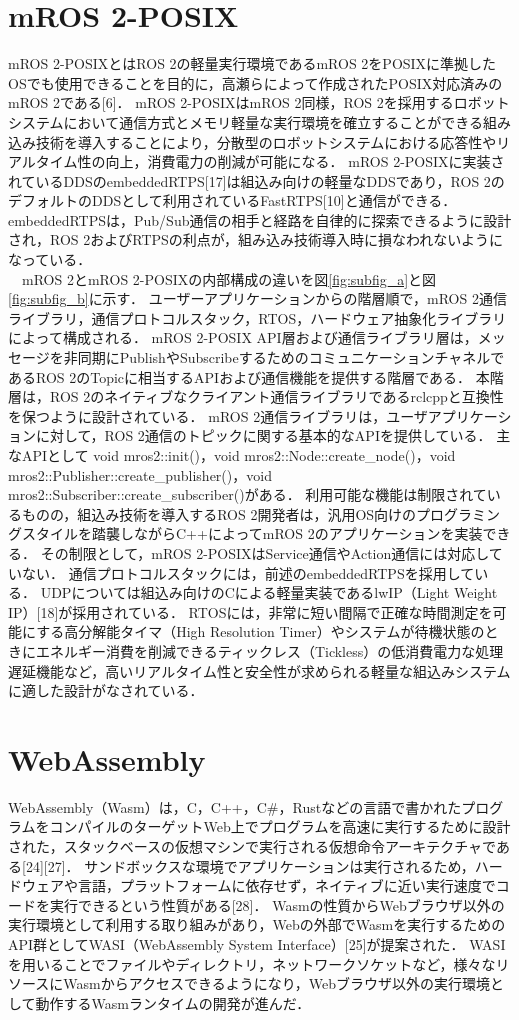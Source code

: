 \section{mROS 2-POSIX}
mROS 2-POSIXとはROS 2の軽量実行環境であるmROS 2をPOSIXに準拠したOSでも使用できることを目的に，高瀬らによって作成されたPOSIX対応済みのmROS 2である[6]．
mROS 2-POSIXはmROS 2同様，ROS 2を採用するロボットシステムにおいて通信方式とメモリ軽量な実行環境を確立することができる組み込み技術を導入することにより，分散型のロボットシステムにおける応答性やリアルタイム性の向上，消費電力の削減が可能になる．
mROS 2-POSIXに実装されているDDSのembeddedRTPS[17]は組込み向けの軽量なDDSであり，ROS 2のデフォルトのDDSとして利用されているFastRTPS[10]と通信ができる．
embeddedRTPSは，Pub/Sub通信の相手と経路を自律的に探索できるように設計され，ROS 2およびRTPSの利点が，組み込み技術導入時に損なわれないようになっている．
\\　mROS 2とmROS 2-POSIXの内部構成の違いを図\ref{fig:subfig_a}と図\ref{fig:subfig_b}に示す．
ユーザーアプリケーションからの階層順で，mROS 2通信ライブラリ，通信プロトコルスタック，RTOS，ハードウェア抽象化ライブラリによって構成される．
mROS 2-POSIX API層および通信ライブラリ層は，メッセージを非同期にPublishやSubscribeするためのコミュニケーションチャネルであるROS 2のTopicに相当するAPIおよび通信機能を提供する階層である．
本階層は，ROS 2のネイティブなクライアント通信ライブラリであるrclcppと互換性を保つように設計されている．
mROS 2通信ライブラリは，ユーザアプリケーションに対して，ROS 2通信のトピックに関する基本的なAPIを提供している．
主なAPIとして void mros2::init()，void mros2::Node::create\_node()，void mros2::Publisher::create\_publisher()，void mros2::Subscriber::create\_subscriber()がある．
利用可能な機能は制限されているものの，組込み技術を導入するROS 2開発者は，汎用OS向けのプログラミングスタイルを踏襲しながらC++によってmROS 2のアプリケーションを実装できる．
その制限として，mROS 2-POSIXはService通信やAction通信には対応していない．
通信プロトコルスタックには，前述のembeddedRTPSを採用している．
UDPについては組込み向けのCによる軽量実装であるlwIP（Light Weight IP）[18]が採用されている．
RTOSには，非常に短い間隔で正確な時間測定を可能にする高分解能タイマ（High Resolution Timer）やシステムが待機状態のときにエネルギー消費を削減できるティックレス（Tickless）の低消費電力な処理遅延機能など，高いリアルタイム性と安全性が求められる軽量な組込みシステムに適した設計がなされている．
\section{WebAssembly}
WebAssembly（Wasm）は，C，C++，C\#，Rustなどの言語で書かれたプログラムをコンパイルのターゲットWeb上でプログラムを高速に実行するために設計された，スタックベースの仮想マシンで実行される仮想命令アーキテクチャである[24][27]．
サンドボックスな環境でアプリケーションは実行されるため，ハードウェアや言語，プラットフォームに依存せず，ネイティブに近い実行速度でコードを実行できるという性質がある[28]．
Wasmの性質からWebブラウザ以外の実行環境として利用する取り組みがあり，Webの外部でWasmを実行するためのAPI群としてWASI（WebAssembly System Interface）[25]が提案された．
WASIを用いることでファイルやディレクトリ，ネットワークソケットなど，様々なリソースにWasmからアクセスできるようになり，Webブラウザ以外の実行環境として動作するWasmランタイムの開発が進んだ．
